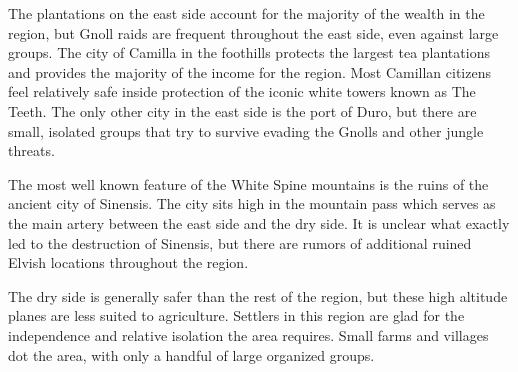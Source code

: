 The plantations on the east side account for the majority of the wealth in the region, but Gnoll raids are frequent throughout the east side, even against large groups.
The city of Camilla in the foothills protects the largest tea plantations and provides the majority of the income for the region.
Most Camillan citizens feel relatively safe inside protection of the iconic white towers known as The Teeth.
The only other city in the east side is the port of Duro, but there are small, isolated groups that try to survive evading the Gnolls and other jungle threats.

The most well known feature of the White Spine mountains is the ruins of the ancient city of Sinensis.
The city sits high in the mountain pass which serves as the main artery between the east side and the dry side.
It is unclear what exactly led to the destruction of Sinensis, but there are rumors of additional ruined Elvish locations throughout the region.

The dry side is generally safer than the rest of the region, but these high altitude planes are less suited to agriculture.
Settlers in this region are glad for the independence and relative isolation the area requires.
Small farms and villages dot the area, with only a handful of large organized groups.
